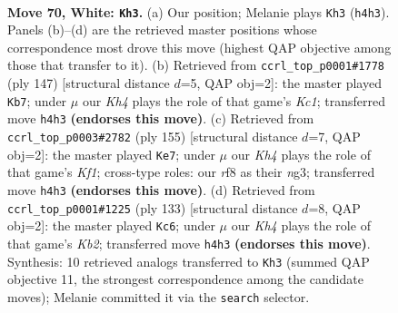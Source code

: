 \documentclass[11pt]{article}
\begin{document}
\clearpage

\begin{figure}[p]\centering
\begin{subfigure}{0.46\textwidth}\centering
\resizebox{\linewidth}{!}{%
\newchessgame
\chessboard[
  setfen={5r1k/P2R4/8/8/7K/8/8/8 w - - 9 70},
  showmover=false,
  pgfstyle=straightmove, color=movearrow, markmove={h4-h3}
]}
\caption{}
\end{subfigure}\hfill
\begin{subfigure}{0.46\textwidth}\centering
\resizebox{\linewidth}{!}{%
\newchessgame
\chessboard[
  setfen={2k5/p7/8/8/8/2N5/5K1R/r7 b - - 0 74},
  showmover=false,
  pgfstyle=straightmove, color=movearrow, markmove={c8-b7}
]}
\caption{}
\end{subfigure}
\\[4pt]
\begin{subfigure}{0.46\textwidth}\centering
\resizebox{\linewidth}{!}{%
\newchessgame
\chessboard[
  setfen={5k2/8/8/1R5K/8/p5N1/8/r7 b - - 6 78},
  showmover=false,
  pgfstyle=straightmove, color=movearrow, markmove={f8-e7}
]}
\caption{}
\end{subfigure}\hfill
\begin{subfigure}{0.46\textwidth}\centering
\resizebox{\linewidth}{!}{%
\newchessgame
\chessboard[
  setfen={8/1k6/1p6/8/2P5/8/7r/1K2R3 b - - 12 67},
  showmover=false,
  pgfstyle=straightmove, color=movearrow, markmove={b7-c6}
]}
\caption{}
\end{subfigure}
\caption{\textbf{Move 70, White: \texttt{Kh3}.} (a) Our position; Melanie plays \texttt{Kh3} (\texttt{h4h3}). Panels (b)--(d) are the retrieved master positions whose correspondence most drove this move (highest QAP objective among those that transfer to it). (b) Retrieved from \texttt{ccrl\_top\_p0001\#1778} (ply 147) [structural distance $d$=5, QAP obj=2]: the master played \texttt{Kb7}; under $\mu$ our \emph{Kh4} plays the role of that game's \emph{Kc1}; transferred move \texttt{h4h3} \textbf{(endorses this move)}. (c) Retrieved from \texttt{ccrl\_top\_p0003\#2782} (ply 155) [structural distance $d$=7, QAP obj=2]: the master played \texttt{Ke7}; under $\mu$ our \emph{Kh4} plays the role of that game's \emph{Kf1}; cross-type roles: our \emph{r}f8 as their \emph{n}g3; transferred move \texttt{h4h3} \textbf{(endorses this move)}. (d) Retrieved from \texttt{ccrl\_top\_p0001\#1225} (ply 133) [structural distance $d$=8, QAP obj=2]: the master played \texttt{Kc6}; under $\mu$ our \emph{Kh4} plays the role of that game's \emph{Kb2}; transferred move \texttt{h4h3} \textbf{(endorses this move)}. Synthesis: 10 retrieved analogs transferred to \texttt{Kh3} (summed QAP objective 11, the strongest correspondence among the candidate moves); Melanie committed it via the \texttt{search} selector.}
\label{fig:thought-m138}
\end{figure}
\end{document}
